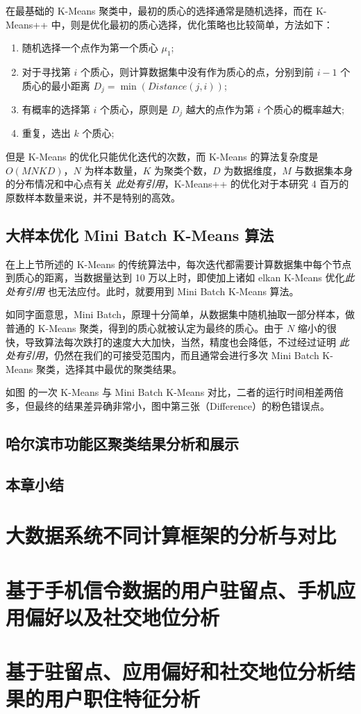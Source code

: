 在最基础的 K-Means 聚类中，最初的质心的选择通常是随机选择，而在 K-Means++ 中，则是优化最初的质心选择，优化策略也比较简单，方法如下：

\begin{enumerate}
    \item 随机选择一个点作为第一个质心 $\mu_{1}$;
    \item 对于寻找第 $i$ 个质心，则计算数据集中没有作为质心的点，分别到前 $i - 1$ 个质心的最小距离 $D_{j} = \min(Distance(j, i))$;
    \item 有概率的选择第 $i$ 个质心，原则是 $D_{j}$ 越大的点作为第 $i$ 个质心的概率越大;
    \item 重复，选出 $k$ 个质心;
\end{enumerate}

但是 K-Means 的优化只能优化迭代的次数，而 K-Means 的算法复杂度是 $O(MNKD)$，$N$ 为样本数量，$K$ 为聚类个数，$D$ 为数据维度，$M$ 与数据集本身的分布情况和中心点有关 \emph{此处有引用}，K-Means++ 的优化对于本研究 4 百万的原数样本数量来说，并不是特别的高效。

\section{大样本优化 Mini Batch K-Means 算法}

在上上节所述的 K-Means 的传统算法中，每次迭代都需要计算数据集中每个节点到质心的距离，当数据量达到 10 万以上时，即使加上诸如 elkan K-Means 优化\emph{此处有引用} 也无法应付。此时，就要用到 Mini Batch K-Means 算法。

如同字面意思，Mini Batch，原理十分简单，从数据集中随机抽取一部分样本，做普通的 K-Means 聚类，得到的质心就被认定为最终的质心。由于 $N$ 缩小的很快，导致算法每次跌打的速度大大加快，当然，精度也会降低，不过经过证明 \emph{此处有引用}，仍然在我们的可接受范围内，而且通常会进行多次 Mini Batch K-Means 聚类，选择其中最优的聚类结果。

如图  的一次 K-Means 与 Mini Batch K-Means 对比，二者的运行时间相差两倍多，但最终的结果差异确非常小，图中第三张（Difference）的粉色错误点。

\section{哈尔滨市功能区聚类结果分析和展示}

\section{本章小结}

\chapter{大数据系统不同计算框架的分析与对比}

\chapter{基于手机信令数据的用户驻留点、手机应用偏好以及社交地位分析}

\chapter{基于驻留点、应用偏好和社交地位分析结果的用户职住特征分析}

